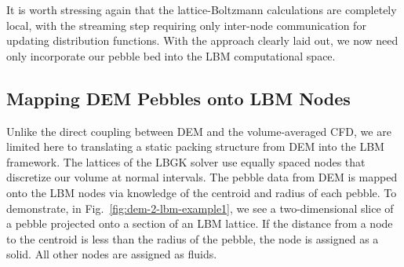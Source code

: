 It is worth stressing again that the lattice-Boltzmann calculations are completely local, with the streaming step requiring only inter-node communication for updating distribution functions. With the approach clearly laid out, we now need only incorporate our pebble bed into the LBM computational space.



\subsection{Mapping DEM Pebbles onto LBM Nodes}

Unlike the direct coupling between DEM and the volume-averaged CFD, we are limited here to translating a static packing structure from DEM into the LBM framework. The lattices of the LBGK solver use equally spaced nodes that discretize our volume at normal intervals. The pebble data from DEM is mapped onto the LBM nodes via knowledge of the centroid and radius of each pebble. To demonstrate, in Fig.~\ref{fig:dem-2-lbm-example1}, we see a two-dimensional slice of a pebble projected onto a section of an LBM lattice. If the distance from a node to the centroid is less than the radius of the pebble, the node is assigned as a solid. All other nodes are assigned as fluids.

